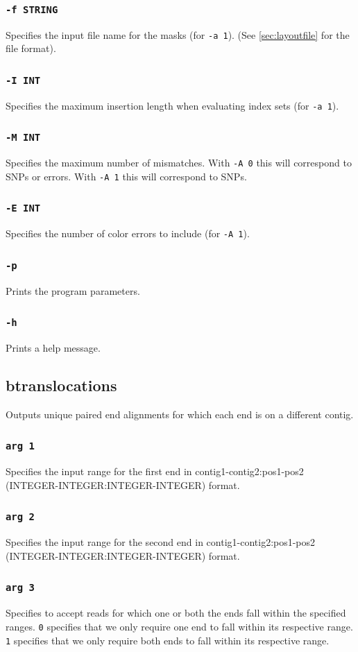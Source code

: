 \documentclass[a4paper,12pt]{book}
\newcommand{\TT}[1]{{\tt #1}} %
\begin{document}
\subsubsection{\TT{-f STRING}}
Specifies the input file name for the masks (for \TT{-a 1}).
(See \autoref{sec:layoutfile} for the file format).
\subsubsection{\TT{-I INT}}
Specifies the maximum insertion length when evaluating index sets (for \TT{-a 1}).
\subsubsection{\TT{-M INT}}
Specifies the maximum number of mismatches.
With \TT{-A 0} this will correspond to SNPs or errors.
With \TT{-A 1} this will correspond to SNPs.
\subsubsection{\TT{-E INT}}
Specifies the number of color errors to include (for \TT{-A 1}).
\subsubsection{\TT{-p}}
Prints the program parameters.
\subsubsection{\TT{-h}}
Prints a help message.
\subsection{btranslocations}
\label{sec:btranslocations}
Outputs unique paired end alignments for which each end is on a different contig.
\subsubsection{\TT{arg 1}}
Specifies the input range for the first end in contig1-contig2:pos1-pos2 (INTEGER-INTEGER:INTEGER-INTEGER) format.
\subsubsection{\TT{arg 2}}
Specifies the input range for the second end in contig1-contig2:pos1-pos2 (INTEGER-INTEGER:INTEGER-INTEGER) format.
\subsubsection{\TT{arg 3}}
Specifies to accept reads for which one or both the ends fall within the specified ranges.
\TT{0} specifies that we only require one end to fall within its respective range.
\TT{1} specifies that we only require both ends to fall within its respective range.
\end{document}

